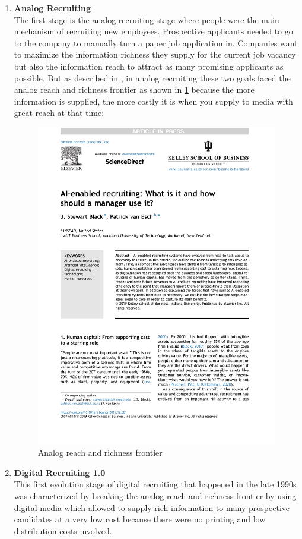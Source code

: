 \documentclass[draft,final]{thesisclass} %
\begin{document}
\begin{enumerate}
    \item \textbf{Analog Recruiting} \label{analog_recruting}\\
    The first stage is the analog recruiting stage where people were the main mechanism of recruiting new employees.
    Prospective applicants needed to go to the company to manually turn a paper job application in.
    Companies want to maximize the information richness they supply for the current job vacancy but also the information reach to attract as many promising applicants as possible.
    But as described in \cite[2]{ai_recruiting}, in analog recruiting these two goals faced the analog reach and richness frontier as shown in \ref{fig:analog_reach_richness_frontier} because the more information is supplied, the more costly it is when you supply to media with great reach at that time:
    \begin{figure}[H]
        \centering
        \includegraphics[scale=0.5,page=2,width=0.6\linewidth,trim={300 100 55 515},clip]{literature/ai_recruiting.pdf}
        \caption{Analog reach and richness frontier \cite[2]{ai_recruiting}}
        \label{fig:analog_reach_richness_frontier}
    \end{figure}
    \item \textbf{Digital Recruiting 1.0} \label{digital_recruiting_1}\\
    This first evolution stage of digital recruiting that happened in the late 1990s was characterized by breaking the analog reach and richness frontier by using digital media which allowed to supply rich information to many prospective candidates at a very low cost because there were no printing and low distribution costs involved.

\end{enumerate}
\end{document}
